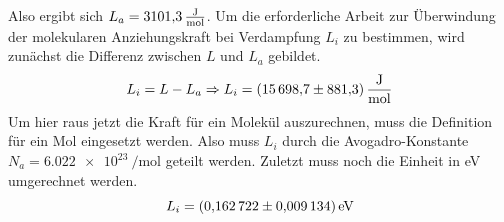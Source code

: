 Also ergibt sich $L_a = \SI{3101.3}{\frac{\J}{\mol}}$.
Um die erforderliche Arbeit zur Überwindung der molekularen Anziehungskraft bei Verdampfung $L_i$ zu bestimmen, wird
zunächst die Differenz zwischen $L$ und $L_a$ gebildet.
\begin{equation}
    L_i = L - L_a \Rightarrow L_i = \SI{15698.7 \pm 881.3}{\frac{\J}{\mol}}
\end{equation}
Um hier raus jetzt die Kraft für ein Molekül auszurechnen, muss die Definition für ein Mol eingesetzt werden.
Also muss $L_i$ durch die Avogadro-Konstante $N_a = \SI{6.022e23}{\per\mol}$ \cite{Avogadro} geteilt werden.
Zuletzt muss noch die Einheit in eV umgerechnet werden.
\begin{equation*}
  L_i = \SI{0.162722 \pm 0.009134 }{eV}
\end{equation*}

